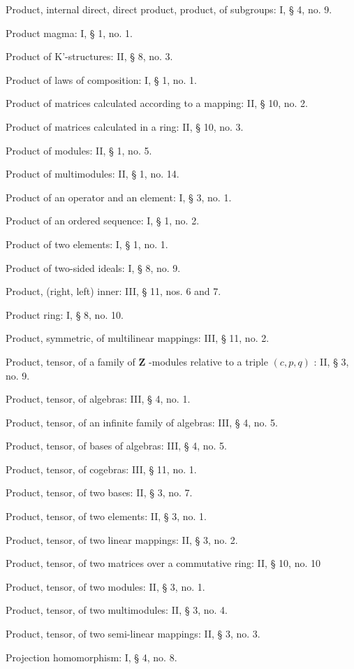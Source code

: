 Product, internal direct, direct product, product, of subgroups: I, § 4, no. 9.

Product magma: I, § 1, no. 1.

Product of K'-structures: II, § 8, no. 3.

Product of laws of composition: I, § 1, no. 1.

Product of matrices calculated according to a mapping: II, § 10, no. 2.

Product of matrices calculated in a ring: II, § 10, no. 3.

Product of modules: II, § 1, no. 5.

Product of multimodules: II, § 1, no. 14.

Product of an operator and an element: I, § 3, no. 1.

Product of an ordered sequence: I, § 1, no. 2.

Product of two elements: I, § 1, no. 1.

Product of two-sided ideals: I, § 8, no. 9.

Product, (right, left) inner: III, § 11, nos. 6 and 7.

Product ring: I, § 8, no. 10.

Product, symmetric, of multilinear mappings: III, § 11, no. 2.

Product, tensor, of a family of \(\mathbf{Z}\) -modules relative to a triple \((c, p, q)\) : II, § 3, no. 9.

Product, tensor, of algebras: III, § 4, no. 1.

Product, tensor, of an infinite family of algebras: III, § 4, no. 5.

Product, tensor, of bases of algebras: III, § 4, no. 5.

Product, tensor, of cogebras: III, § 11, no. 1.

Product, tensor, of two bases: II, § 3, no. 7.

Product, tensor, of two elements: II, § 3, no. 1.

Product, tensor, of two linear mappings: II, § 3, no. 2.

Product, tensor, of two matrices over a commutative ring: II, § 10, no. 10

Product, tensor, of two modules: II, § 3, no. 1.

Product, tensor, of two multimodules: II, § 3, no. 4.

Product, tensor, of two semi-linear mappings: II, § 3, no. 3.

Projection homomorphism: I, § 4, no. 8.

